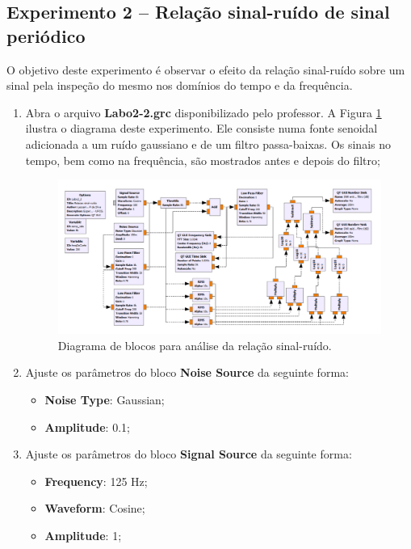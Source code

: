 \documentclass[12pt,addpoints]{exam}
\newcommand{\myscale}{0.4}
\begin{document}
\subsection{Experimento 2 -- Relação sinal-ruído de sinal periódico}

O objetivo deste experimento é observar o efeito da relação sinal-ruído sobre um sinal pela inspeção do mesmo nos domínios do tempo e da frequência.

\begin{enumerate}
    \item Abra o arquivo \textbf{Labo2-2.grc} disponibilizado pelo professor. A Figura \ref{fig:GRC_2-2a} ilustra o diagrama deste experimento. Ele consiste numa fonte senoidal adicionada a um ruído gaussiano e de um filtro passa-baixas. Os sinais no tempo, bem como na frequência, são mostrados antes e depois do filtro;
    \begin{figure}[htb]
        \centering
        \includegraphics[scale=\myscale]{./Figuras/GRC_2-2}
        \caption{Diagrama de blocos para análise da relação sinal-ruído.} 
        \label{fig:GRC_2-2a}
    \end{figure}
    \item Ajuste os parâmetros do bloco \textbf{Noise Source} da seguinte forma:
    \begin{itemize}
        \item \textbf{Noise Type}: Gaussian;
        \item \textbf{Amplitude}: 0.1;
    \end{itemize}
    \item Ajuste os parâmetros do bloco \textbf{Signal Source} da seguinte forma:
    \begin{itemize}
        \item \textbf{Frequency}: 125 Hz;
        \item \textbf{Waveform}: Cosine;
        \item \textbf{Amplitude}: 1;

\end{itemize}
\end{enumerate}
\end{document}

